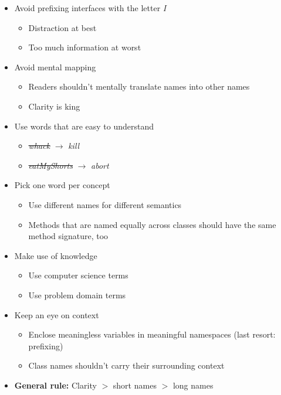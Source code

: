 \begin{itemize}
\begin{itemize}
    \end{itemize}
    \item Avoid prefixing interfaces with the letter \textit{I}
    \begin{itemize}
        \item Distraction at best
        \item Too much information at worst
    \end{itemize}
    \item Avoid mental mapping
    \begin{itemize}
        \item Readers shouldn't mentally translate names into other names
        \item Clarity is king
    \end{itemize}
    \item Use words that are easy to understand
    \begin{itemize}
        \item \st{\textit{whack}} $\rightarrow$ \textit{kill}
        \item \st{\textit{eatMyShorts}} $\rightarrow$ \textit{abort}
    \end{itemize}
    \item Pick one word per concept
    \begin{itemize}
        \item Use different names for different semantics
        \item Methods that are named equally across classes should have the same method signature, too
    \end{itemize}
    \item Make use of knowledge
    \begin{itemize}
        \item Use computer science terms
        \item Use problem domain terms
    \end{itemize}
    \item Keep an eye on context
    \begin{itemize}
        \item Enclose meaningless variables in meaningful namespaces (last resort: prefixing)
        \item Class names shouldn't carry their surrounding context
    \end{itemize}
    \item \textbf{General rule:} Clarity $>$ short names $>$ long names
\end{itemize}
